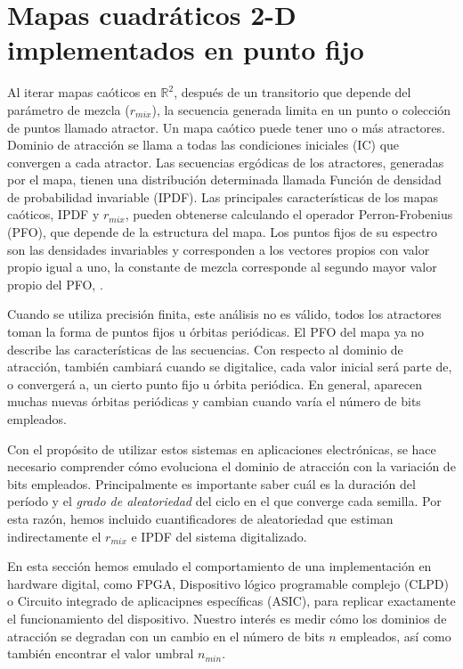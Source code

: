 \section{Mapas cuadráticos 2-D implementados en punto fijo}
\label{sec:StochDegr}

Al iterar mapas caóticos en $\mathbb{R} ^ 2 $, después de un transitorio que depende del parámetro de mezcla ($r_{mix}$), la secuencia generada limita en un punto o colección de puntos llamado atractor.
Un mapa caótico puede tener uno o más atractores.
Dominio de atracción se llama a todas las condiciones iniciales (IC) que convergen a cada atractor.
Las secuencias ergódicas de los atractores, generadas por el mapa, tienen una distribución determinada llamada Función de densidad de probabilidad invariable (IPDF).
Las principales características de los mapas caóticos, IPDF y $r_{mix}$, pueden obtenerse calculando el operador Perron-Frobenius (PFO), que depende de la estructura del mapa.
Los puntos fijos de su espectro son las densidades invariables y corresponden a los vectores propios con valor propio igual a uno, la constante de mezcla corresponde al segundo mayor valor propio del PFO, \cite{Lasota1994, Lasota1973}.

Cuando se utiliza precisión finita, este análisis no es válido, todos los atractores toman la forma de puntos fijos u órbitas periódicas.
El PFO del mapa ya no describe las características de las secuencias.
Con respecto al dominio de atracción, también cambiará cuando se digitalice, cada valor inicial será parte de, o convergerá a, un cierto punto fijo u órbita periódica.
En general, aparecen muchas nuevas órbitas periódicas y cambian cuando varía el número de bits empleados.

Con el propósito de utilizar estos sistemas en aplicaciones electrónicas, se hace necesario comprender cómo evoluciona el dominio de atracción con la variación de bits empleados.
Principalmente es importante saber cuál es la duración del período y el \textsl{grado de aleatoriedad} del ciclo en el que converge cada semilla.
Por esta razón, hemos incluido cuantificadores de aleatoriedad que estiman indirectamente el $r_{mix}$ e IPDF del sistema digitalizado.

En esta sección hemos emulado el comportamiento de una implementación en hardware digital, como FPGA, Dispositivo lógico programable complejo (CLPD) o Circuito integrado de aplicacipnes específicas (ASIC), para replicar exactamente el funcionamiento del dispositivo.
Nuestro interés es medir cómo los dominios de atracción se degradan con un cambio en el número de bits $n$ empleados, así como también encontrar el valor umbral
$n_{min}$.

